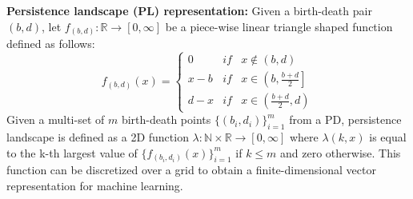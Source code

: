 \documentclass{article}
\begin{document}
\smallskip 
\noindent \textbf{Persistence landscape (PL) representation:} Given a birth-death pair $(b,d)$, let $f_{(b,d)}: \mathbb{R} \to [0, \infty]$ be a piece-wise linear triangle shaped function defined as follows:
\begin{equation}
f_{(b,d)}\left ( x \right ) = \left\{\begin{array}{lll}
 0 & if & x \notin \left(b,d\right)\\ 
 x - b & if & x \in \left(b, \frac{b + d}{2}\right]\\ 
 d - x & if & x \in \left(\frac{b + d}{2}, d\right)
\end{array}\right.    
\end{equation}
Given a multi-set of $m$ birth-death points $\{(b_i, d_i)\}_{i=1}^{m}$ from a PD, persistence landscape is defined as a 2D function $\lambda : \mathbb{N} \times \mathbb{R} \to [0, \infty]$ where $\lambda(k, x)$ is equal to the k-th largest value of $\{f_{(b_i, d_i)}\left(x\right)\}_{i=1}^{m}$ if $k \leq m$ and zero otherwise. This function can be discretized over a grid to obtain a finite-dimensional vector representation for machine learning.
\end{document}
